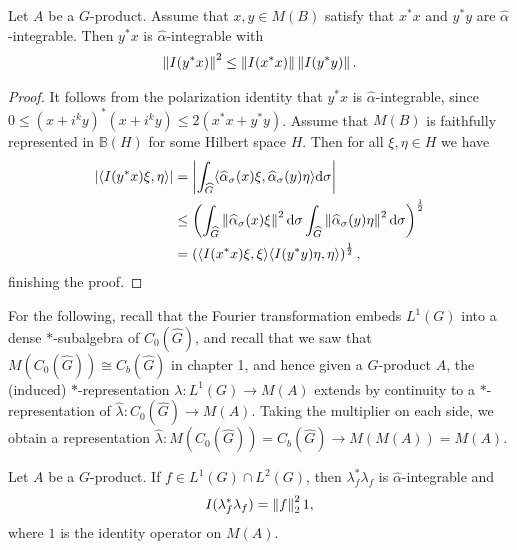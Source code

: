 \begin{lemma}
Let $A$ be a $G$-product. Assume that $x,y \in M(B)$ satisfy that $x^*x$ and $y^*y$ are $\hat \alpha$-integrable. Then $y^*x$ is $\hat \alpha$-integrable with
\begin{align*}
	\left\lVert I(y^*x)\right\rVert^2 \leq \left\lVert I(x^*x) \right\rVert \left\lVert I(y^*y)\right\rVert.
\end{align*}
	\label{olpe1lemma2.5}
\end{lemma}
\begin{proof}
	It follows from the polarization identity that $y^*x$ is $\hat \alpha$-integrable, since $0 \leq (x+i^ky)^*(x+i^ky) \leq 2(x^*x+y^*y)$. Assume that $M(B)$ is faithfully represented in $\mathbb{B}(H)$ for some Hilbert space $H$. Then for all $\xi, \eta \in H$ we have
	\begin{align*}
		|\langle I(y^*x) \xi , \eta\rangle| &= \left| \int_{\widehat{G}} \langle \widehat{\alpha}_\sigma(x) \xi , \widehat{\alpha}_\sigma(y) \eta \rangle \mathrm{d} \sigma\right| \\
		&\leq \left( \int_{\widehat{G}} \left\lVert \widehat{\alpha}_\sigma(x) \xi \right\rVert ^2 \mathrm{d} \sigma \int_{\widehat{G}} \left\lVert \widehat{\alpha}_\sigma(y) \eta \right\rVert^2 \mathrm{d} \sigma \right)^{\frac12}\\
		&= \left( \langle I(x^*x) \xi, \xi \rangle \langle I(y^*y) \eta, \eta \rangle  \right)^{\frac12},
	\end{align*}
	finishing the proof.
\end{proof}
\begin{remark}	
	For the following, recall that the Fourier transformation embeds $L^1(G)$ into a dense $*$-subalgebra of $C_0(\hat G)$, and recall that we saw that $M(C_0(\hat G)) \cong C_b(\hat G)$ in chapter 1, and hence given a $G$-product $A$, the (induced) $*$-representation $\lambda \colon L^1(G) \to M(A)$ extends by continuity to a $*$-representation of $\hat \lambda \colon C_0(\hat G)\to M(A)$. Taking the multiplier on each side, we obtain a representation $\hat \lambda \colon M(C_0(\hat G)) = C_b(\hat G) \to M(M(A)) = M(A)$.
\end{remark}
\begin{lemma}
	Let $A$ be a $G$-product. If $f \in L^1(G) \cap L^2(G)$, then $\lambda_f^* \lambda_f$ is $\hat \alpha$-integrable and
\begin{align*}
	I(\lambda_f^* \lambda_f) = \left\lVert f \right\rVert_ 2^2 1,
\end{align*}
where $1$ is the identity operator on $M(A)$.
	\label{olpe1lemma2.6}
\end{lemma}
